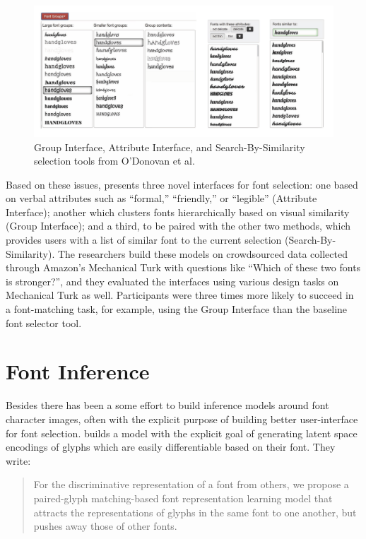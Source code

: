\begin{figure}[htbp]
    \centering
    \includegraphics[width=1\textwidth]{images/odonovan-interfaces.png}
    \caption{Group Interface, Attribute Interface, and Search-By-Similarity selection tools from O'Donovan et al.}
    \label{fig:odonovan-interfaces}
\end{figure}

Based on these issues, \cite{odonovan2014} presents three novel interfaces for font selection: one based on verbal attributes such as ``formal,'' ``friendly,'' or ``legible'' (Attribute Interface); another which clusters fonts hierarchically based on visual similarity (Group Interface); and a third, to be paired with the other two methods, which provides users with a list of similar font to the current selection (Search-By-Similarity). The researchers build these models on crowdsourced data collected through Amazon's Mechanical Turk with questions like ``Which of these two fonts is stronger?'', and they evaluated the interfaces using various design tasks on Mechanical Turk as well. Participants were three times more likely to succeed in a font-matching task, for example, using the Group Interface than the baseline font selector tool.

\section{Font Inference}

Besides \cite{odonovan2014} there has been a some effort to build inference models around font character images, often with the explicit purpose of building better user-interface for font selection. \cite{cho2022} builds a model with the explicit goal of generating latent space encodings of glyphs which are easily differentiable based on their font. They write:

\begin{quote}

For the discriminative representation of a font from others, we propose a paired-glyph
matching-based font representation learning model that attracts the representations of
glyphs in the same font to one another, but pushes away those of other fonts.
	
\end{quote}

